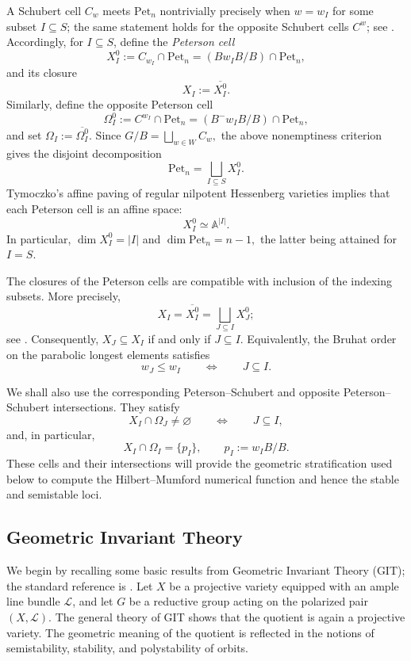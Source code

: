 \documentclass[12pt, reqno]{amsart}
\theoremstyle{plain}
\numberwithin{equation}{section}
\theoremstyle{definition}
\begin{document}
A Schubert cell \(C_w\) meets \(\mathrm{Pet}_n\) nontrivially precisely
when \(w=w_I\) for some subset \(I\subseteq S\); the same statement holds
for the opposite Schubert cells \(C^w\); see
\cite[Lemma~3.5]{Abe}. Accordingly, for \(I\subseteq S\), define the
\emph{Peterson cell}
\[
X_I^0
:=
C_{w_I}\cap\mathrm{Pet}_n
=
(Bw_IB/B)\cap\mathrm{Pet}_n,
\]
and its closure
\[
X_I:=\overline{X_I^0}.
\]
Similarly, define the opposite Peterson cell
\[
\Omega_I^0
:=
C^{w_I}\cap\mathrm{Pet}_n
=
(B^-w_IB/B)\cap\mathrm{Pet}_n,
\]
and set $\Omega_I:=\overline{\Omega_I^0}.$ Since $G/B=\bigsqcup_{w\in W}C_w,$
the above nonemptiness criterion gives the disjoint decomposition
\[
\mathrm{Pet}_n
=
\bigsqcup_{I\subseteq S}X_I^0.
\]
Tymoczko's affine paving of regular nilpotent Hessenberg varieties
\cite{Tymoczko1} implies that each Peterson cell is an affine space:
\[
X_I^0\simeq\mathbb A^{|I|}.
\]
In particular, $\dim X_I^0=|I|$ and $\dim\mathrm{Pet}_n=n-1,$
the latter being attained for \(I=S\).

The closures of the Peterson cells are compatible with inclusion of the
indexing subsets. More precisely,
\begin{equation}\label{eq:peterson-cell-closure}
X_I
=
\overline{X_I^0}
=
\bigsqcup_{J\subseteq I}X_J^0;
\end{equation}
see \cite[Equation~(3.7)]{Abe}. Consequently, $X_J\subseteq X_I$ if and only if $J\subseteq I.$
Equivalently, the Bruhat order on the parabolic longest elements satisfies
\[
w_J\le w_I
\qquad\Longleftrightarrow\qquad
J\subseteq I.
\]

We shall also use the corresponding Peterson--Schubert and opposite
Peterson--Schubert intersections. They satisfy
\[
X_I\cap\Omega_J\neq\varnothing
\qquad\Longleftrightarrow\qquad
J\subseteq I,
\]
and, in particular,
\[
X_I\cap\Omega_I=\{p_I\},
\qquad
p_I:=w_IB/B.
\]
These cells and their intersections will provide the geometric
stratification used below to compute the Hilbert--Mumford numerical
function and hence the stable and semistable loci.

\subsection{Geometric Invariant Theory}
We begin by recalling some basic results from Geometric Invariant Theory (GIT); the standard reference is \cite{GIT}. Let $X$ be a projective variety equipped with an ample line bundle $\mathcal L$, and let $G$ be a reductive group acting on the polarized pair $(X,\mathcal L)$. The general theory of GIT shows that the quotient is again a projective variety. The geometric meaning of the quotient is reflected in the notions of semistability, stability, and polystability of orbits.
\end{document}
